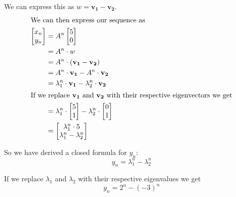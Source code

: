 We can express this as $w = \mathbf{v_1} - \mathbf{v_2}$.\\[2ex]
\begin{align*}
	\intertext{We can then express our sequence as}
	\begin{bmatrix}x_{n}\\y_{n}\end{bmatrix} & =  A^n\begin{bmatrix}5\\0\end{bmatrix}                                                                  \\
	                                         & = A^n\cdot w                                                                                            \\
	                                         & = A^n\cdot (\mathbf{v_1}-\mathbf{v_2})                                                                  \\
	                                         & = A^n\cdot \mathbf{v_1}- A^n \cdot \mathbf{v_2}                                                         \\
	                                         & = \lambda_1^n\cdot \mathbf{v_1}- \lambda_2^n \cdot \mathbf{v_2}                                         \\
	\intertext{If we replace $\mathbf{v_1}$ and $\mathbf{v_2}$ with their respective eigenvectors we get}
	                                         & = \lambda_1^n\cdot \begin{bmatrix}5\\1\end{bmatrix}- \lambda_2^n \cdot \begin{bmatrix}0\\1\end{bmatrix} \\
	                                         & = \begin{bmatrix}\lambda_1^{n}\cdot 5\\\lambda_1^n-\lambda_2^n\end{bmatrix}
\end{align*}

So we have derived a closed formula for $y_n$:
\[
	y_n = \lambda_1^{n}-\lambda_2^n
\]

If we replace $\lambda_1$ and $\lambda_2$ with their respective eigenvalues we get
\[
	y_n = 2^n-(-3)^n
\]

